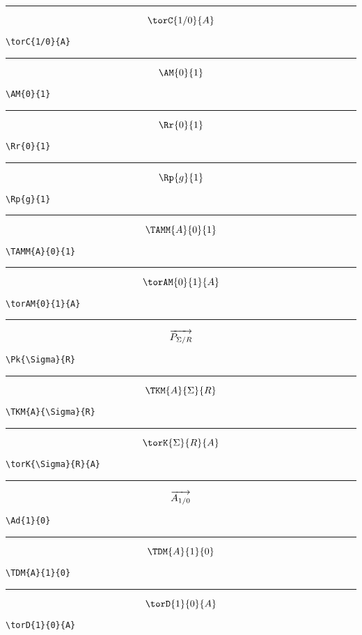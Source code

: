 \documentclass[a4paper,9pt]{article}
\begin{document}
\hrule
$$\torC{1/0}{A}$$
\begin{verbatim}
\torC{1/0}{A}
\end{verbatim}

\hrule
$$\AM{0}{1}$$
\begin{verbatim}
\AM{0}{1}
\end{verbatim}

\hrule
$$\Rr{0}{1}$$
\begin{verbatim}
\Rr{0}{1}
\end{verbatim}

\hrule
$$\Rp{g}{1}$$
\begin{verbatim}
\Rp{g}{1}
\end{verbatim}

\hrule

$$\TAMM{A}{0}{1}$$
\begin{verbatim}
\TAMM{A}{0}{1}
\end{verbatim}

\hrule

$$\torAM{0}{1}{A}$$
\begin{verbatim}
\torAM{0}{1}{A}
\end{verbatim}

\hrule

$$\overrightarrow{P_{\Sigma/R}}$$
\begin{verbatim}
\Pk{\Sigma}{R}
\end{verbatim}

\hrule

$$\TKM{A}{\Sigma}{R}$$
\begin{verbatim}
\TKM{A}{\Sigma}{R}
\end{verbatim}

\hrule

$$\torK{\Sigma}{R}{A}$$
\begin{verbatim}
\torK{\Sigma}{R}{A}
\end{verbatim}

\hrule

$$\overrightarrow{A_{{1}/{0}}}$$
\begin{verbatim}
\Ad{1}{0}
\end{verbatim}

\hrule

$$\TDM{A}{1}{0}$$
\begin{verbatim}
\TDM{A}{1}{0}
\end{verbatim}

\hrule

$$\torD{1}{0}{A}$$
\begin{verbatim}
\torD{1}{0}{A}
\end{verbatim}
\end{document}
